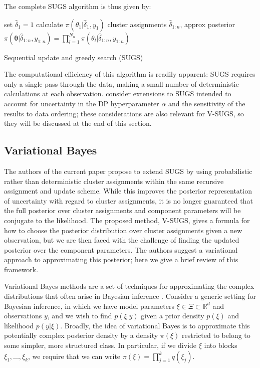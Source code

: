 \documentclass{uwstat572}
\begin{document}
The complete SUGS algorithm is thus given by:
\medskip

\begin{algorithm}[H]
 set $\hat{\delta}_1 = 1$ \;
 calculate $\pi(\theta_1 | \hat{\delta}_1, y_1)$ \;
  \Return cluster assignments $\hat{\delta}_{1:n}$, approx posterior $\pi({\bm \theta} | \hat{\delta}_{1:n},y_{1:n}) = \prod_{l=1}^{N_n} \pi(\theta_l | \hat{\delta}_{1:n},y_{1:n})$
 \caption{Sequential update and greedy search (SUGS)}
\end{algorithm}
\vspace{5pt}

The computational efficiency of this algorithm is readily apparent: SUGS requires only a single pass through the data, making a small number of deterministic calculations at each observation. \cite{wang} consider extensions to SUGS intended to account for uncertainty in the DP hyperparameter $\alpha$ and the sensitivity of the results to data ordering; these considerations are also relevant for V-SUGS, so they will be discussed at the end of this section.

\subsection{Variational Bayes}

The authors of the current paper propose to extend SUGS by using probabilistic rather than deterministic cluster assignments within the same recursive assignment and update scheme. While this improves the posterior representation of uncertainty with regard to cluster assignments, it is no longer guaranteed that the full posterior over cluster assignments and component parameters will be conjugate to the likelihood. The proposed method, V-SUGS, gives a formula for how to choose the posterior distribution over cluster assignments given a new observation, but we are then faced with the challenge of finding the updated posterior over the component parameters. The authors suggest a variational approach to approximating this posterior; here we give a brief review of this framework.

Variational Bayes methods are a set of techniques for approximating the complex distributions that often arise in Bayesian inference \citep{jordan}. Consider a generic setting for Bayesian inference, in which we have model parameters $\xi \in \Xi \subset \mathbb{R}^d$ and observations $y$, and we wish to find $p(\xi | y)$ given a prior density $p(\xi)$ and likelihood $p(y | \xi)$. Broadly, the idea of variational Bayes is to approximate this potentially complex posterior density by a density $\pi(\xi)$ restricted to belong to some simpler, more structured class. In particular, if we divide $\xi$ into blocks $\xi_1,...,\xi_k$, we require that we can write $ \pi(\xi) = \prod_{j=1}^k q(\xi_j)$.
\end{document}
